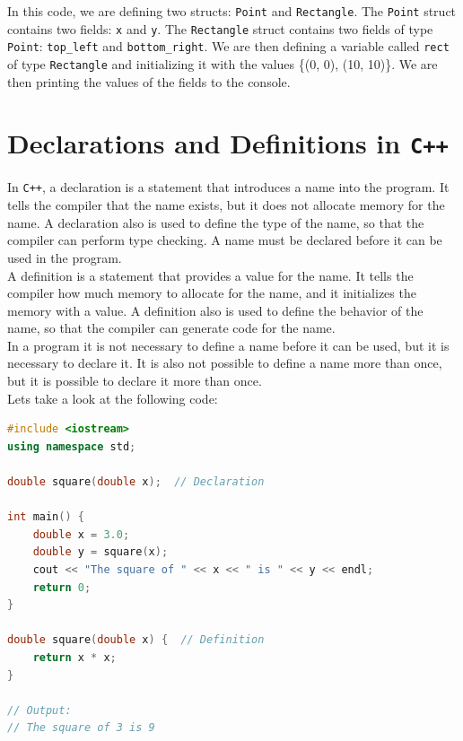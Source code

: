 In this code, we are defining two structs: \texttt{Point} and \texttt{Rectangle}. The \texttt{Point} struct contains two fields:
\texttt{x} and \texttt{y}. The \texttt{Rectangle} struct contains two fields of type \texttt{Point}: \texttt{top\_left} and
\texttt{bottom\_right}. We are then defining a variable called \texttt{rect} of type \texttt{Rectangle} and initializing it
with the values \{(0, 0), (10, 10)\}. We are then printing the values of the fields to the console.\\

\section{Declarations and Definitions in \texttt{C++}}

In \texttt{C++}, a declaration is a statement that introduces a name into the program. It tells the compiler that the name
exists, but it does not allocate memory for the name. A declaration also is used to define the type of the name, so that the
compiler can perform type checking. A name must be declared before it can be used in the program.\\

A definition is a statement that provides a value for the name. It tells the compiler how much memory to allocate for 
the name, and it initializes the memory with a value. A definition also is used to define the behavior of the name, so that
the compiler can generate code for the name.\\ 

In a program it is not necessary to define a name before it can be used, but it is necessary to declare it. It is also not
possible to define a name more than once, but it is possible to declare it more than once.\\

Lets take a look at the following code:

\begin{lstlisting}[language=C++]
#include <iostream>
using namespace std;

double square(double x);  // Declaration

int main() {
    double x = 3.0;
    double y = square(x);
    cout << "The square of " << x << " is " << y << endl;
    return 0;
}

double square(double x) {  // Definition
    return x * x;
}

// Output:
// The square of 3 is 9
\end{lstlisting}

